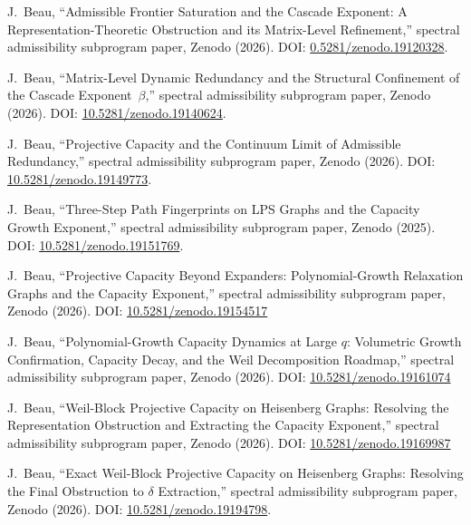 J.~Beau,
``Admissible Frontier Saturation and the Cascade Exponent: A Representation-Theoretic Obstruction and its Matrix-Level
Refinement,''
spectral admissibility subprogram paper, Zenodo (2026).
DOI: \href{https://doi.org/10.5281/zenodo.19120328}{0.5281/zenodo.19120328}.

J.~Beau,
``Matrix-Level Dynamic Redundancy and the Structural Confinement of the Cascade Exponent~$\beta$,''
spectral admissibility subprogram paper, Zenodo (2026).
DOI: \href{https://doi.org/10.5281/zenodo.19140624}{10.5281/zenodo.19140624}.

J.~Beau,
``Projective Capacity and the Continuum Limit of Admissible Redundancy,''
spectral admissibility subprogram paper, Zenodo (2026).
DOI: \href{https://doi.org/10.5281/zenodo.19149773}{10.5281/zenodo.19149773}.

J.~Beau,
``Three-Step Path Fingerprints on LPS Graphs and the Capacity Growth Exponent,''
spectral admissibility subprogram paper, Zenodo (2025).
DOI: \href{https://doi.org/10.5281/zenodo.19151769}{10.5281/zenodo.19151769}.

J.~Beau,
``Projective Capacity Beyond Expanders: Polynomial-Growth Relaxation Graphs and the Capacity Exponent,''
spectral admissibility subprogram paper, Zenodo (2026).
DOI: \href{https://doi.org/10.5281/zenodo.19154517}{10.5281/zenodo.19154517}

J.~Beau,
``Polynomial-Growth Capacity Dynamics at Large $q$: Volumetric Growth Confirmation, Capacity Decay, and the Weil
Decomposition Roadmap,''
spectral admissibility subprogram paper, Zenodo (2026).
DOI: \href{https://doi.org/10.5281/zenodo.19161074}{10.5281/zenodo.19161074}

J.~Beau,
``Weil-Block Projective Capacity on Heisenberg Graphs: Resolving the Representation Obstruction and Extracting the
Capacity Exponent,''
spectral admissibility subprogram paper, Zenodo (2026).
DOI: \href{https://doi.org/10.5281/zenodo.19169987}{10.5281/zenodo.19169987}

J.~Beau,
``Exact Weil-Block Projective Capacity on Heisenberg Graphs: Resolving the Final Obstruction to $\delta$ Extraction,''
spectral admissibility subprogram paper, Zenodo (2026).
DOI: \href{https://doi.org/10.5281/zenodo.19194798}{10.5281/zenodo.19194798}.
